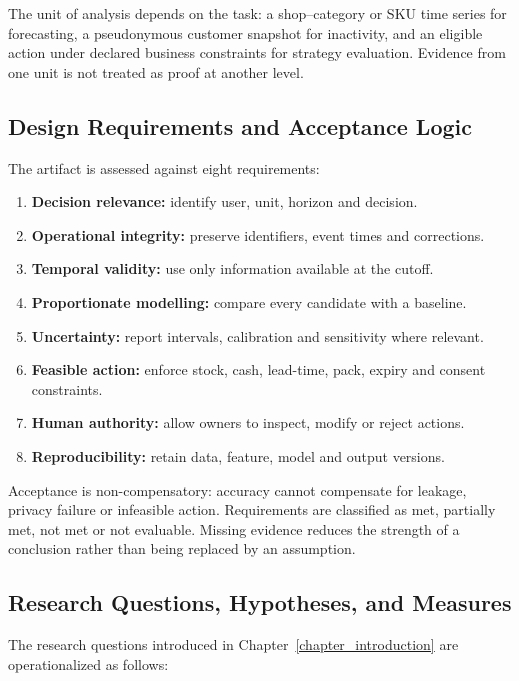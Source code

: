 \documentclass[a4paper,11pt,oneside]{book}
\theoremstyle{plain}
\theoremstyle{definition}
\theoremstyle{remark}
\begin{document}
The unit of analysis depends on the task: a shop--category or SKU time series
for forecasting, a pseudonymous customer snapshot for inactivity, and an
eligible action under declared business constraints for strategy evaluation.
Evidence from one unit is not treated as proof at another level.

\subsection{Design Requirements and Acceptance Logic}
The artifact is assessed against eight requirements:
\begin{enumerate}[label=DR\arabic*.]
\item \textbf{Decision relevance:} identify user, unit, horizon and decision.
\item \textbf{Operational integrity:} preserve identifiers, event times and corrections.
\item \textbf{Temporal validity:} use only information available at the cutoff.
\item \textbf{Proportionate modelling:} compare every candidate with a baseline.
\item \textbf{Uncertainty:} report intervals, calibration and sensitivity where relevant.
\item \textbf{Feasible action:} enforce stock, cash, lead-time, pack, expiry and consent constraints.
\item \textbf{Human authority:} allow owners to inspect, modify or reject actions.
\item \textbf{Reproducibility:} retain data, feature, model and output versions.
\end{enumerate}
Acceptance is non-compensatory: accuracy cannot compensate for leakage,
privacy failure or infeasible action. Requirements are classified as met,
partially met, not met or not evaluable. Missing evidence reduces the
strength of a conclusion rather than being replaced by an assumption.

\subsection{Research Questions, Hypotheses, and Measures}

The research questions introduced in Chapter~\ref{chapter_introduction} are
operationalized as follows:
\end{document}
